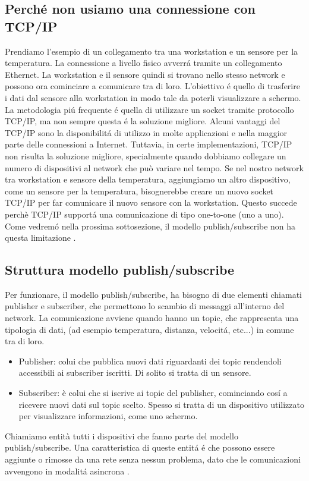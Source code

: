\subsection{Perché non usiamo una connessione con TCP/IP}
Prendiamo l'esempio di un collegamento tra una workstation e 
un sensore per la temperatura. La connessione a livello fisico
avverrá tramite un collegamento Ethernet. La workstation e il 
sensore quindi si trovano nello stesso network e possono 
ora cominciare a comunicare tra di loro. L'obiettivo é quello
di trasferire i dati dal sensore alla workstation in modo tale
da poterli visualizzare a schermo.
La metodologia piú frequente é quella di utilizzare un socket tramite 
protocollo TCP/IP, ma non sempre questa é la soluzione migliore.
Alcuni vantaggi del TCP/IP sono la disponibilitá di utilizzo 
in molte applicazioni e nella maggior parte 
delle connessioni a Internet.
Tuttavia, in certe implementazioni, TCP/IP non risulta la soluzione migliore,
specialmente quando dobbiamo collegare un numero di dispositivi al 
network che può variare nel tempo. Se nel nostro network tra workstation e 
sensore della temperatura, aggiungiamo un altro dispositivo, come un 
sensore per la temperatura, bisognerebbe creare un nuovo socket 
TCP/IP per far comunicare il nuovo sensore con la workstation.
Questo succede perchè TCP/IP supportá una comunicazione di tipo 
one-to-one (uno a uno). Come vedremó nella prossima sottosezione,
il modello publish/subscribe non ha questa limitazione \cite{1494965}.

\subsection{Struttura modello publish/subscribe}
Per funzionare, il modello publish/subscribe, ha bisogno di
due elementi chiamati publisher e subscriber, 
che permettono lo scambio di messaggi all'interno del network.
La comunicazione avviene 
quando hanno un topic, che
rappresenta una tipologia di dati, (ad esempio temperatura, 
distanza, velocitá, etc...) in comune tra di loro.
\begin{itemize}
    \item Publisher: colui che pubblica nuovi dati riguardanti dei
    topic rendendoli accessibili ai subscriber iscritti. 
    Di solito si tratta di un sensore.
    \item Subscriber: è colui che si iscrive ai topic del publisher, 
    cominciando
    cosí a ricevere nuovi dati sul topic scelto. Spesso si tratta
    di un dispositivo utilizzato per visualizzare informazioni, come uno
    schermo.
\end{itemize}
Chiamiamo entità tutti i dispositivi che fanno parte del modello 
publish/subscribe.
Una caratteristica di queste entitá é che possono essere aggiunte o rimosse
da una rete senza nessun problema, dato che le 
comunicazioni avvengono in modalitá asincrona \cite{dds1.4}. 

